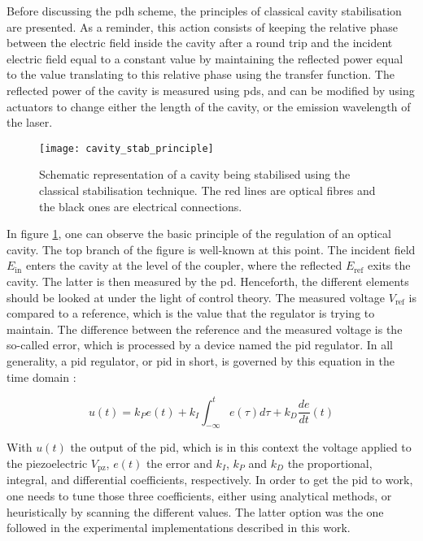 \label{subsubsec-cavity-stab}

Before discussing the \gls{pdh} scheme, the principles of classical cavity stabilisation are presented. As a reminder, this action consists of keeping the relative phase between the electric field inside the cavity after a round trip and the incident electric field equal to a constant value by maintaining the reflected power equal to the value translating to this relative phase using the transfer function. The reflected power of the cavity is measured using \glspl{pd}, and can be modified by using actuators to change either the length of the cavity, or the emission wavelength of the laser. \\

\begin{figure}
	\centering
	\texttt{[image: cavity\_stab\_principle]}
	\caption{Schematic representation of a cavity being stabilised using the classical stabilisation technique. The red lines are optical fibres and the black ones are electrical connections.}
	\label{cavity_stab_principle}
\end{figure}

In figure \ref{cavity_stab_principle}, one can observe the basic principle of the regulation of an optical cavity. The top branch of the figure is well-known at this point. The incident field $E_{\text{in}}$ enters the cavity at the level of the coupler, where the reflected $E_{\text{ref}}$ exits the cavity. The latter is then measured by the \gls{pd}. Henceforth, the different elements should be looked at under the light of control theory. The measured voltage $V_{\text{ref}}$ is compared to a reference, which is the value that the regulator is trying to maintain. The difference between the reference and the measured voltage is the so-called error, which is processed by a device named the \gls{pid} regulator. In all generality, a \gls{pid} regulator, or \gls{pid} in short, is governed by this equation in the time domain \cite[p.196]{franklin2015feedback}:

\begin{equation}
	u(t) = k_P e(t) + k_I \int_{-\infty}^t e(\tau) d\tau + k_D \frac{de}{dt}(t)
\end{equation}

With $u(t)$ the output of the \gls{pid}, which is in this context the voltage applied to the piezoelectric $V_{\text{pz}}$, $e(t)$ the error and $k_I$, $k_P$ and $k_D$ the proportional, integral, and differential coefficients, respectively. In order to get the \gls{pid} to work, one needs to tune those three coefficients, either using analytical methods, or heuristically by scanning the different values. The latter option was the one followed in the experimental implementations described in this work.\\

